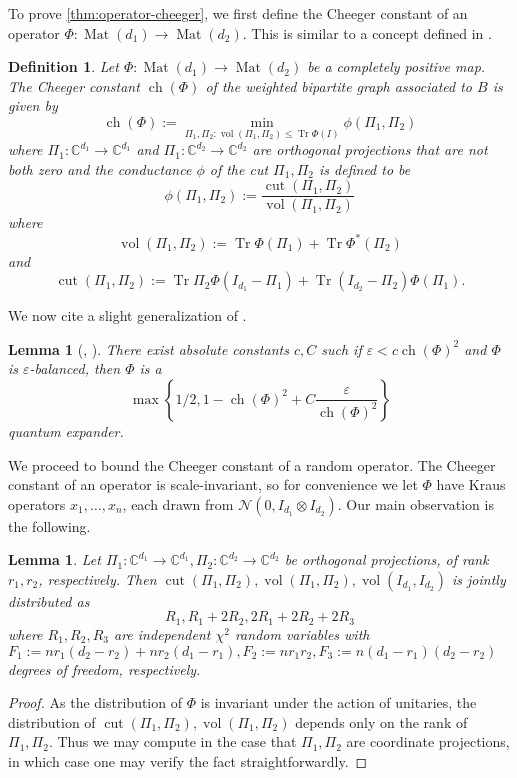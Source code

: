 \documentclass{article}
\newtheorem{lemma}[theorem]{Lemma}
\newtheorem{definition}{Definition}
\newcommand{\C}{{\mathbb{C}}}
\newcommand{\ot}{\otimes}
\newcommand{\mat}{\operatorname{Mat}}
\newcommand{\ch}{\operatorname{ch}}
\newcommand{\cut}{\operatorname{cut}}
\newcommand{\vol}{\operatorname{vol}}
\newcommand\eps{\varepsilon}
\newcommand\cN{\mathcal{N}}
\newcommand\samp{x}
\newcommand\tr{\operatorname{Tr}}
\begin{document}
To prove \cref{thm:operator-cheeger}, we first define the Cheeger constant of an operator $\Phi:\mat(d_1) \to \mat(d_2)$. This is similar to a concept defined in \cite{H07}.
\begin{definition}
Let $\Phi : \mat(d_1) \to \mat(d_2)$ be a completely positive map. The Cheeger constant $\ch(\Phi)$ of the weighted bipartite graph associated to $B$ is given by
$$\ch(\Phi):=\min_{\Pi_1, \Pi_2: \vol(\Pi_1, \Pi_2) \leq \tr \Phi(I)} \phi(\Pi_1,\Pi_2)$$
where $\Pi_1: \C^{d_1} \to \C^{d_1}$ and $\Pi_1: \C^{d_2} \to \C^{d_2}$ are orthogonal projections that are not both zero and the \emph{conductance} $\phi$ of the cut $\Pi_1, \Pi_2$ is defined to be
$$\phi(\Pi_1,\Pi_2) := \frac{\cut(\Pi_1, \Pi_2)}{\vol(\Pi_1,\Pi_2)}$$
where
$$ \vol(\Pi_1,\Pi_2):=
\tr \Phi(\Pi_1) + \tr \Phi^*(\Pi_2)$$
and $$ \cut(\Pi_1, \Pi_2):= \tr \Pi_2 \Phi(I_{d_1} - \Pi_1) + \tr (I_{d_2} - \Pi_2) \Phi(\Pi_1).$$
\end{definition}

We now cite a slight generalization of \cite{FM20}.

\begin{lemma} [\cite{FM20}, \cite{KLR19}]\label{lem:op-cheeger} There exist absolute constants $c, C$ such if $\eps < c \ch(\Phi)^2$ and $\Phi$ is $\eps$-balanced, then $\Phi$ is a
$$ \max\left\{1/2, 1 -  \ch(\Phi)^2 + C \frac{\eps}{\ch(\Phi)^2} \right\}$$
quantum expander.
\end{lemma}
We proceed to bound the Cheeger constant of a random operator. The Cheeger constant of an operator is scale-invariant, so for convenience we let $\Phi$ have Kraus operators $\samp_1, \dots, \samp_n$, each drawn from $\cN(0,  I_{d_1} \ot I_{d_2}).$ Our main observation is the following.

\begin{lemma}\label{fact:chi} Let $\Pi_1:\C^{d_1} \to \C^{d_1}, \Pi_2: \C^{d_2} \to \C^{d_2}$ be orthogonal projections, of rank $r_1, r_2$, respectively. Then $\cut(\Pi_1, \Pi_2), \vol(\Pi_1, \Pi_2), \vol(I_{d_1}, I_{d_2})$ is jointly distributed as
$$ R_1, R_1 + 2R_2, 2R_1 + 2 R_2 + 2R_3$$ where
$R_1, R_2, R_3$ are independent $\chi^2$ random variables with $F_1:=n r_1(d_2 - r_2) + n r_2(d_1-r_1), F_2:= n r_1r_2, F_3:= n(d_1 - r_1)(d_2 - r_2)$ degrees of freedom, respectively.
\end{lemma}
\begin{proof} As the distribution of $\Phi$ is invariant under the action of unitaries, the distribution of $\cut(\Pi_1, \Pi_2), \vol(\Pi_1, \Pi_2)$ depends only on the rank of $\Pi_1, \Pi_2$. Thus we may compute in the case that $\Pi_1, \Pi_2$ are coordinate projections, in which case one may verify the fact straightforwardly.
\end{proof}
\end{document}
